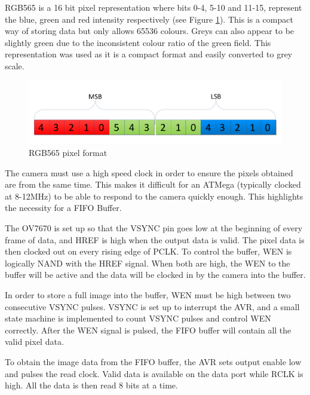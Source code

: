 RGB565 is a 16 bit pixel representation where bits 0-4, 5-10 and 11-15, represent the blue, green and red intensity respectively (see Figure \ref{fig:RGB565}). This is a compact way of storing data but only allows 65536 colours. Greys can also appear to be slightly green due to the inconsistent colour ratio of the green field. This representation was used as it is a compact format and easily converted to grey scale.
\begin{figure}
\includegraphics[width = \textwidth]{./Figures/RGB565.pdf}
\caption{RGB565 pixel format}
\label{fig:RGB565}
\end{figure}

The camera must use a high speed clock in order to ensure the pixels obtained are from the same time. This makes it difficult for an ATMega (typically clocked at 8-12MHz) to be able to respond to the camera quickly enough. This highlights the necessity for a FIFO Buffer. 

The OV7670 is set up so that the VSYNC pin goes low at the beginning of every frame of data, and HREF is high when the output data is valid. The pixel data is then clocked out on every rising edge of PCLK. To control the buffer, WEN is logically NAND with the HREF signal. When both are high, the WEN to the buffer will be active and the data will be clocked in by the camera into the buffer. 

In order to store a full image into the buffer, WEN must be high between two consecutive VSYNC pulses. VSYNC is set up to interrupt the AVR, and a small state machine is implemented to count VSYNC pulses and control WEN correctly. After the WEN signal is pulsed, the FIFO buffer will contain all the valid pixel data.

To obtain the image data from the FIFO buffer, the AVR sets output enable low and pulses the read clock. Valid data is available on the data port while RCLK is high. All the data is then read 8 bits at a time.

